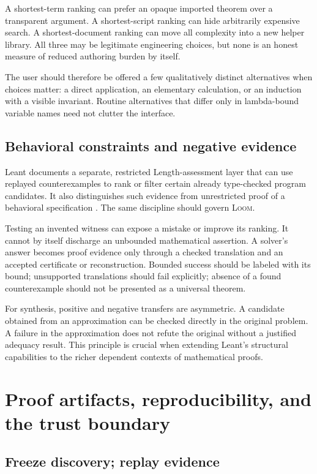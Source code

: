 \documentclass[11pt,letterpaper]{article}
\newcommand{\Loom}{\textsc{Loom}}
\theoremstyle{remark}
\begin{document}
A shortest-term ranking can prefer an opaque imported theorem over a transparent argument. A shortest-script ranking can hide arbitrarily expensive search. A shortest-document ranking can move all complexity into a new helper library. All three may be legitimate engineering choices, but none is an honest measure of reduced authoring burden by itself.

The user should therefore be offered a few qualitatively distinct alternatives when choices matter: a direct application, an elementary calculation, or an induction with a visible invariant. Routine alternatives that differ only in lambda-bound variable names need not clutter the interface.

\subsection{Behavioral constraints and negative evidence}

Leant documents a separate, restricted Length-assessment layer that can use replayed counterexamples to rank or filter certain already type-checked program candidates. It also distinguishes such evidence from unrestricted proof of a behavioral specification \cite{leant-readme,leant-internals}. The same discipline should govern \Loom.

Testing an invented witness can expose a mistake or improve its ranking. It cannot by itself discharge an unbounded mathematical assertion. A solver's answer becomes proof evidence only through a checked translation and an accepted certificate or reconstruction. Bounded success should be labeled with its bound; unsupported translations should fail explicitly; absence of a found counterexample should not be presented as a universal theorem.

For synthesis, positive and negative transfers are asymmetric. A candidate obtained from an approximation can be checked directly in the original problem. A failure in the approximation does not refute the original without a justified adequacy result. This principle is crucial when extending Leant's structural capabilities to the richer dependent contexts of mathematical proofs.

\section{Proof artifacts, reproducibility, and the trust boundary}
\label{sec:trust}

\subsection{Freeze discovery; replay evidence}
\end{document}
